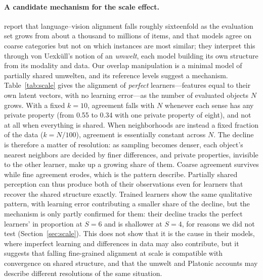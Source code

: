\documentclass[11pt]{article}
\begin{document}
\paragraph{A candidate mechanism for the scale effect.} \citet{koepke2026cave} report that language--vision alignment falls roughly sixteenfold as the evaluation set grows from about a thousand to millions of items, and that models agree on coarse categories but not on which instances are most similar; they interpret this through von Uexküll's notion of an \emph{umwelt}, each model building its own structure from its modality and data. Our overlap manipulation is a minimal model of partially shared umwelten, and its reference levels suggest a mechanism. Table~\ref{tab:scale} gives the alignment of \emph{perfect} learners---features equal to their own latent vectors, with no learning error---as the number of evaluated objects $N$ grows. With a fixed $k=10$, agreement falls with $N$ whenever each sense has any private property (from 0.55 to 0.34 with one private property of eight), and not at all when everything is shared. When neighborhoods are instead a fixed fraction of the data ($k=N/100$), agreement is essentially constant across $N$. The decline is therefore a matter of resolution: as sampling becomes denser, each object's nearest neighbors are decided by finer differences, and private properties, invisible to the other learner, make up a growing share of them. Coarse agreement survives while fine agreement erodes, which is the pattern \citet{koepke2026cave} describe. Partially shared perception can thus produce both of their observations even for learners that recover the shared structure exactly. Trained learners show the same qualitative pattern, with learning error contributing a smaller share of the decline, but the mechanism is only partly confirmed for them: their decline tracks the perfect learners' in proportion at $S=6$ and is shallower at $S=4$, for reasons we did not test (Section~\ref{sec:scale}). This does not show that it is the cause in their models, where imperfect learning and differences in data may also contribute, but it suggests that falling fine-grained alignment at scale is compatible with convergence on shared structure, and that the umwelt and Platonic accounts may describe different resolutions of the same situation.
\end{document}
